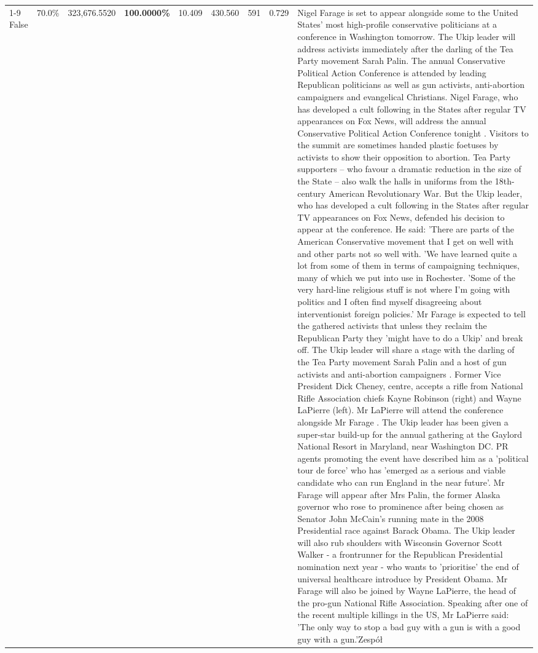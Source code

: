 \begin{table}[H]
\begin{tabular}{lllrlllll}
\cline{1-9}
False & 70.0\% & 323,676.5520 & \bfseries \color{red} 100.0000\% & 10.409 & 430.560 & 591 & 0.729 & Nigel Farage is set to appear alongside some to the United States' most high-profile conservative politicians at a conference in Washington tomorrow. The Ukip leader will address activists immediately after the darling of the Tea Party movement Sarah Palin. The annual Conservative Political Action Conference is attended by leading Republican politicians as well as gun activists, anti-abortion campaigners and evangelical Christians. Nigel Farage, who has developed a cult following in the States after regular TV appearances on Fox News, will address the annual Conservative Political Action Conference tonight . Visitors to the summit are sometimes handed plastic foetuses by activists to show their opposition to abortion. Tea Party supporters – who favour a dramatic reduction in the size of the State – also walk the halls in uniforms from the 18th-century American Revolutionary War. But the Ukip leader, who has developed a cult following in the States after regular TV appearances on Fox News, defended his decision to appear at the conference. He said: 'There are parts of the American Conservative movement that I get on well with and other parts not so well with. 'We have learned quite a lot from some of them in terms of campaigning techniques, many of which we put into use in Rochester. 'Some of the very hard-line religious stuff is not where I'm going with politics and I often find myself disagreeing about interventionist foreign policies.' Mr Farage is expected to tell the gathered activists that unless they reclaim the Republican Party they 'might have to do a Ukip' and break off. The Ukip leader will share a stage with the darling of the Tea Party movement Sarah Palin and a host of gun activists and anti-abortion campaigners . Former Vice President Dick Cheney, centre, accepts a rifle from National Rifle Association chiefs Kayne Robinson (right) and Wayne LaPierre (left). Mr LaPierre will attend the conference alongside Mr Farage . The Ukip leader has been given a super-star build-up for the annual gathering at the Gaylord National Resort in Maryland, near Washington DC. PR agents promoting the event have described him as a 'political tour de force' who has 'emerged as a serious and viable candidate who can run England in the near future'. Mr Farage will appear after Mrs Palin, the former Alaska governor who rose to prominence after being chosen as Senator John McCain's running mate in the 2008 Presidential race against Barack Obama. The Ukip leader will also rub shoulders with Wisconsin Governor Scott Walker - a frontrunner for the Republican Presidential nomination next year - who wants to 'prioritise' the end of universal healthcare introduce by President Obama. Mr Farage will also be joined by Wayne LaPierre, the head of the pro-gun National Rifle Association. Speaking after one of the recent multiple killings in the US, Mr LaPierre said: 'The only way to stop a bad guy with a gun is with a good guy with a gun.'Zespół \\

\end{tabular}
\end{table}

